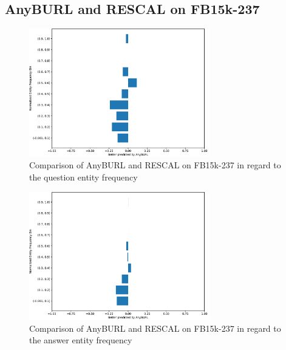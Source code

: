 \subsection{AnyBURL and RESCAL on FB15k-237}

\begin{figure}[H]
\centering
\includegraphics[width=0.7\textwidth]{images/entity_freq_question_anyburl_rescal_fb15k.PNG}
\caption{Comparison of AnyBURL and RESCAL on FB15k-237 in regard to the question entity frequency}
\label{fig:entity_question_tail_anyburl_rescal_fb15k}
\end{figure}

\begin{figure}[H]
\centering
\includegraphics[width=0.7\textwidth]{images/entity_freq_answer_anyburl_rescal_fb15k.PNG}
\caption{Comparison of AnyBURL and RESCAL on FB15k-237 in regard to the answer entity frequency}
\label{fig:entity_answer_tail_anyburl_rescal_fb15k}
\end{figure}

